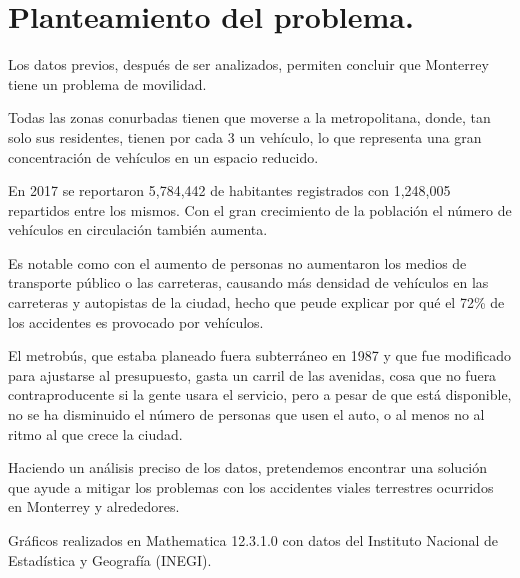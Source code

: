 \documentclass[a4paper]{article}
\begin{document}
\section{Planteamiento del problema.}

Los datos previos, después de ser analizados, permiten concluir que Monterrey tiene un problema de movilidad.

Todas las zonas conurbadas tienen que moverse a la metropolitana,  donde, tan solo sus residentes, tienen por cada 3 un vehículo, lo que representa una gran concentración de vehículos en un espacio reducido.

En 2017 se reportaron 5,784,442 de habitantes registrados con 1,248,005 repartidos entre los mismos. Con el gran crecimiento de la población el número de vehículos en circulación también aumenta. 

Es notable como con el aumento de personas no aumentaron los medios de transporte público o las carreteras, causando más densidad de vehículos en las carreteras y autopistas de la ciudad, hecho que peude explicar por qué el 72\% de los accidentes es provocado por vehículos.

El metrobús, que estaba planeado fuera subterráneo en 1987 y que fue modificado para ajustarse al presupuesto, gasta un carril de las avenidas, cosa que no fuera contraproducente si la gente usara el servicio, pero a pesar de que está disponible, no se ha disminuido el número de personas que usen el auto, o al menos no al ritmo al que crece la ciudad. 

Haciendo un análisis preciso de los datos, pretendemos encontrar una solución que ayude a mitigar los problemas con los accidentes viales terrestres ocurridos en Monterrey y alrededores.


\printbibliography

Gráficos realizados en Mathematica 12.3.1.0 con datos del Instituto Nacional de Estadística y Geografía (INEGI).
\end{document}
